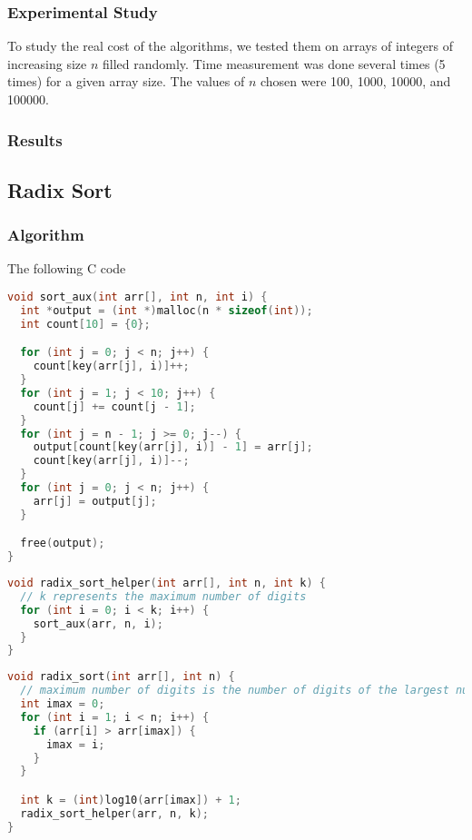\documentclass{article}
\begin{document}
\subsubsection{Experimental Study}
To study the real cost of the algorithms, we tested them on arrays of integers of increasing size $n$ filled randomly. Time measurement was done several times (5 times) for a given array size. The values of $n$ chosen were 100, 1000, 10000, and 100000.

\subsubsection{Results}
\begin{figure}[ht]
\end{figure}


\subsection{Radix Sort}

\subsubsection{Algorithm}
The following C code

\begin{lstlisting}[language=C, caption=Matrix Multiplication]
void sort_aux(int arr[], int n, int i) {
  int *output = (int *)malloc(n * sizeof(int));
  int count[10] = {0};

  for (int j = 0; j < n; j++) {
    count[key(arr[j], i)]++;
  }
  for (int j = 1; j < 10; j++) {
    count[j] += count[j - 1];
  }
  for (int j = n - 1; j >= 0; j--) {
    output[count[key(arr[j], i)] - 1] = arr[j];
    count[key(arr[j], i)]--;
  }
  for (int j = 0; j < n; j++) {
    arr[j] = output[j];
  }

  free(output);
}
\end{lstlisting}

\begin{lstlisting}[language=C, caption=Matrix Multiplication]
void radix_sort_helper(int arr[], int n, int k) {
  // k represents the maximum number of digits
  for (int i = 0; i < k; i++) {
    sort_aux(arr, n, i);
  }
}
\end{lstlisting}

\newpage
\begin{lstlisting}[language=C, caption=Matrix Multiplication]
void radix_sort(int arr[], int n) {
  // maximum number of digits is the number of digits of the largest number
  int imax = 0;
  for (int i = 1; i < n; i++) {
    if (arr[i] > arr[imax]) {
      imax = i;
    }
  }

  int k = (int)log10(arr[imax]) + 1;
  radix_sort_helper(arr, n, k);
}
\end{lstlisting}
\end{document}
